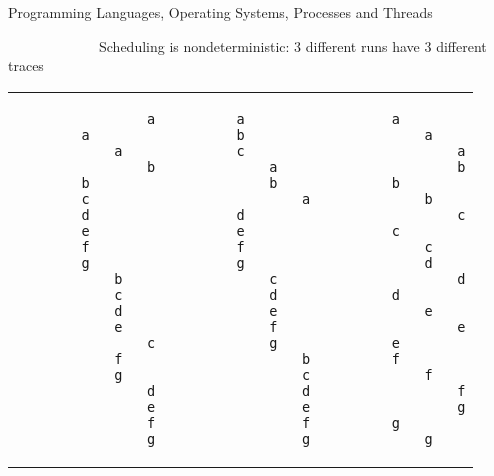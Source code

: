 \documentclass{concdistfoils}
\begin{document}
\begin{section}{Programming Languages, Operating Systems, Processes and Threads}
\begin{slide}
~~~~~~~~~~~~~Scheduling is nondeterministic: 3 different runs have 3 different traces
\vfill
\begin{smaller}
\begin{center}
\begin{tabular}{|c|c|c|}
\quad
\begin{minipage}{2.3in}
\begin{verbatim}
                a
a
        a
                b
b
c
d
e
f
g
        b
        c
        d
        e
                c
        f
        g
                d
                e
                f
                g
\end{verbatim}
\end{minipage}
\quad
\quad
&
\quad
\quad
\begin{minipage}{2.3in}
\begin{verbatim}
a
b
c
        a
        b
                a
d
e
f
g
        c
        d
        e
        f
        g
                b
                c
                d
                e
                f
                g
\end{verbatim}
\end{minipage}
\quad
\quad
&
\quad
\quad
\begin{minipage}{2.3in}
\begin{verbatim}
a
        a
                a
                b
b
        b
                c
c
        c
        d
                d
d
        e
                e
e
f
        f
                f
                g
g
        g
\end{verbatim}
\end{minipage}
\end{tabular}
\end{center}
\end{smaller}
\end{slide}
\end{section}
\end{document}
